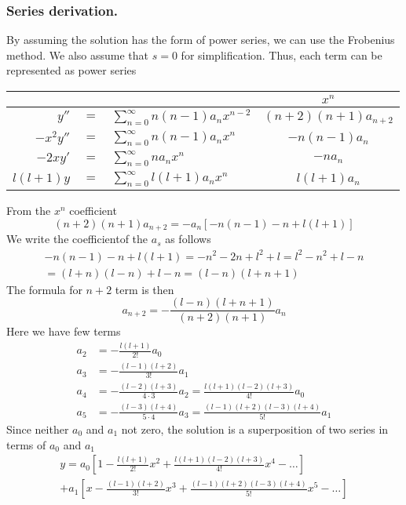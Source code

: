 \documentclass[../main.tex]{subfiles}
\begin{document}
\subsubsection*{Series derivation.} By assuming the solution has the form of power series, we can use the Frobenius method. We also assume that $s=0$ for simplification. Thus, each term can be represented as power series
\begin{center}
    \begin{tabular}{r c l c}
        \toprule
        &&&$x^n$\\
        \midrule
        $y''$&$=$&$\displaystyle\sum_{n=0}^{\infty} n(n-1)a_nx^{n-2}$ &$(n+2)(n+1)a_{n+2}$ \\
        $-x^2y''$&$=$&$\displaystyle\sum_{n=0}^{\infty} n(n-1)a_nx^{n}$ &$-n(n-1)a_n$ \\
        $-2xy'$&$=$&$\displaystyle\sum_{n=0}^{\infty} na_nx^{n}$ & $-na_n$\\
        $l(l+1)y$&$=$&$\displaystyle\sum_{n=0}^{\infty} l(l+1)a_nx^{n}$ & $l(l+1)a_n$\\
        \bottomrule
    \end{tabular}
\end{center}
From the $x^n$ coefficient
\begin{equation*}
    (n+2)(n+1)a_{n+2}=-a_n[-n(n-1)-n+l(l+1)]
\end{equation*}
We write the coefficientof the $a_s$ as follows
\begin{multline*}
    -n(n-1)-n+l(l+1)=-n^2-2n+l^2+l=l^2-n^2+l-n\\
    =(l+n)(l-n)+l-n=(l-n)(l+n+1)
\end{multline*}
The formula for $n+2$ term is then
\begin{equation*}
    a_{n+2}=-\frac{(l-n)(l+n+1)}{(n+2)(n+1)}a_n
\end{equation*}
Here we have few terms
\begin{align*}
    a_2&=-\frac{l(l+1)}{2!}a_0\\
    a_3&=-\frac{(l-1)(l+2)}{3!}a_1\\
    a_4&=-\frac{(l-2)(l+3)}{4\cdot3}a_2=\frac{l(l+1)(l-2)(l+3)}{4!}a_0\\
    a_5&=-\frac{(l-3)(l+4)}{5\cdot4}a_3=\frac{(l-1)(l+2)(l-3)(l+4)}{5!}a_1
\end{align*}
Since neither $a_0$ and $a_1$ not zero, the solution is a superposition of two series in terms of $a_0$ and $a_1$
\begin{multline*}
    y=a_0\left[1-\frac{l(l+1)}{2!}x^2+\frac{l(l+1)(l-2)(l+3)}{4!}x^4-\dots\right]\\
    +a_1\left[x-\frac{(l-1)(l+2)}{3!}x^3+\frac{(l-1)(l+2)(l-3)(l+4)}{5!}x^5-\dots\right]
\end{multline*}
\end{document}
